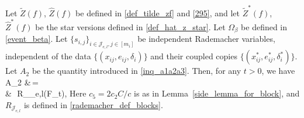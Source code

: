 \documentclass[twoside,11pt]{article}
\newcommand{\rev}[1]{{\color{revisionred}#1}}
\begin{document}
\begin{lemma}[Bound of  $A_2$]
\label{col_A_2}
   Let  $\tilde Z(f)$,  $\hat Z(f)$ be defined in \eqref{def_tilde_zf} and \eqref{295}, and let $\tilde Z^*(f)$,  $\hat Z^*(f)$ be the star versions defined in \eqref{def_hat_z_star}. Let $\Omega_\beta$ be defined in \eqref{event_beta}. Let  $\{s_{i,j}\}_{i \in \mathcal{J}_{e,l},j\in[m_{i}]} $ be independent Rademacher variables, independent of the data $\{(x_{ij}, e_{ij}, \delta_i)\}$ and their coupled copies $\{(x_{ij}^*, e_{ij}^*, \delta_i^*)\}$. Let $A_2$ be the quantity introduced in \eqref{inq_a1a2a3}. Then, for any $t > 0$, we have
\bea 
A_2 &\,=\,  \\
&\,\le\,  \rev{R_{_{e,l}}(\mathcal F_t)},
\bea
\rev{Here $c_5=2c_2C/c$ is as in Lemma~\ref{side_lemma_for_block}, and $R_{\mathcal{J}_{e,l}}$ is defined in \eqref{rademacher_def_blocks}.}
\end{lemma}
\end{document}
